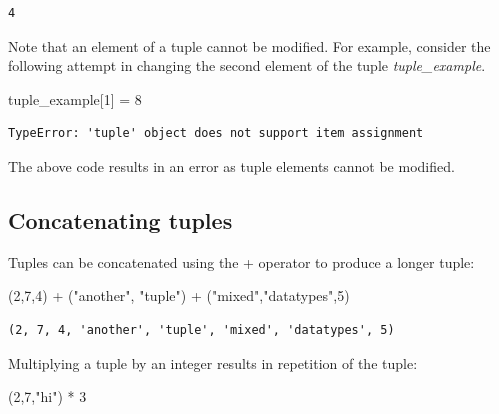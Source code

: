 \documentclass[
  letterpaper,
  DIV=11,
  numbers=noendperiod]{scrreprt}
\newenvironment{Shaded}{\begin{snugshade}}{\end{snugshade}}
\newcommand{\DecValTok}[1]{\textcolor[rgb]{0.68,0.00,0.00}{#1}}
\newcommand{\NormalTok}[1]{\textcolor[rgb]{0.00,0.23,0.31}{#1}}
\newcommand{\OperatorTok}[1]{\textcolor[rgb]{0.37,0.37,0.37}{#1}}
\newcommand{\StringTok}[1]{\textcolor[rgb]{0.13,0.47,0.30}{#1}}
\begin{document}
\begin{verbatim}
4
\end{verbatim}

Note that an element of a tuple cannot be modified. For example,
consider the following attempt in changing the second element of the
tuple \emph{tuple\_example}.

\begin{Shaded}
\begin{Highlighting}[]
\NormalTok{tuple\_example[}\DecValTok{1}\NormalTok{] }\OperatorTok{=} \DecValTok{8}
\end{Highlighting}
\end{Shaded}

\begin{verbatim}
TypeError: 'tuple' object does not support item assignment
\end{verbatim}

The above code results in an error as tuple elements cannot be modified.

\hypertarget{concatenating-tuples}{%
\subsection{Concatenating tuples}\label{concatenating-tuples}}

Tuples can be concatenated using the + operator to produce a longer
tuple:

\begin{Shaded}
\begin{Highlighting}[]
\NormalTok{(}\DecValTok{2}\NormalTok{,}\DecValTok{7}\NormalTok{,}\DecValTok{4}\NormalTok{) }\OperatorTok{+}\NormalTok{ (}\StringTok{"another"}\NormalTok{, }\StringTok{"tuple"}\NormalTok{) }\OperatorTok{+}\NormalTok{ (}\StringTok{"mixed"}\NormalTok{,}\StringTok{"datatypes"}\NormalTok{,}\DecValTok{5}\NormalTok{)}
\end{Highlighting}
\end{Shaded}

\begin{verbatim}
(2, 7, 4, 'another', 'tuple', 'mixed', 'datatypes', 5)
\end{verbatim}

Multiplying a tuple by an integer results in repetition of the tuple:

\begin{Shaded}
\begin{Highlighting}[]
\NormalTok{(}\DecValTok{2}\NormalTok{,}\DecValTok{7}\NormalTok{,}\StringTok{"hi"}\NormalTok{) }\OperatorTok{*} \DecValTok{3}
\end{Highlighting}
\end{Shaded}
\end{document}
